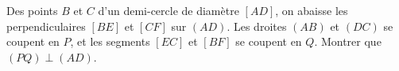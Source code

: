 Des points $B$ et $C$ d'un demi-cercle de diamètre $[AD]$, on abaisse les perpendiculaires $[BE]$ et $[CF]$ sur $(AD)$. Les droites $(AB)$ et $(DC)$ se coupent en $P$, et les segments $[EC]$ et $[BF]$ se coupent en $Q$. Montrer que $(PQ) \perp (AD)$.
